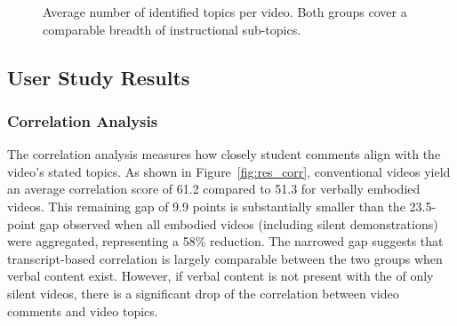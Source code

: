 \begin{figure}[h!]
    \centering
    \caption{Average number of identified topics per video. Both groups cover a comparable breadth of instructional sub-topics.}
    \label{fig:res_topics}
\end{figure}

\subsection{User Study Results}

\subsubsection{Correlation Analysis}
The correlation analysis measures how closely student comments align with the video's stated topics. As shown in Figure~\ref{fig:res_corr}, conventional videos yield an average correlation score of 61.2 compared to 51.3 for verbally embodied videos. This remaining gap of 9.9 points is substantially smaller than the 23.5-point gap observed when all embodied videos (including silent demonstrations) were aggregated, representing a 58\% reduction. The narrowed gap suggests that transcript-based correlation is largely comparable between the two groups when verbal content exist. However, if verbal content is not present with the of only silent videos, there is a significant drop of the correlation between video comments and video topics.   

